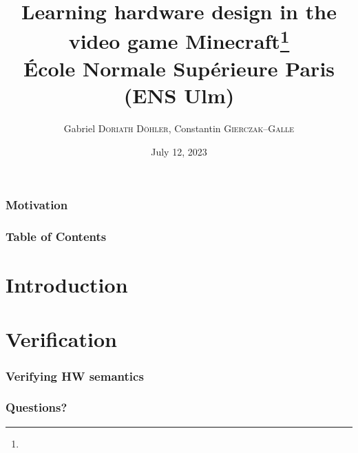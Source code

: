 \documentclass{beamer}
\title{Learning hardware design in the video game Minecraft\footnote{\tiny{}\reproduce}\\\small{} École Normale Supérieure Paris (ENS Ulm)}
\author{Gabriel \textsc{Doriath Döhler}, Constantin \textsc{Gierczak--Galle}}
\date{July 12, 2023}
\begin{document}
\beamertemplatenavigationsymbolsempty
{}

\maketitle

\begin{frame}[fragile]
	\frametitle{Motivation}

\end{frame}

\begin{frame}[fragile]
	\frametitle{Table of Contents}
	\tableofcontents
\end{frame}

\section{Introduction}


\section{Verification}
\begin{frame}
	\frametitle{Verifying HW semantics}
\end{frame}

\begin{frame}[fragile]
	\frametitle{Questions?}
\end{frame}

\newpage


\end{document}
